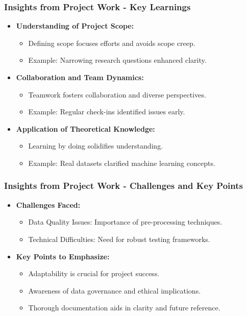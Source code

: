 \documentclass[aspectratio=169]{beamer}
\begin{document}
\begin{frame}[fragile]
    \frametitle{Insights from Project Work - Key Learnings}
    \begin{itemize}
        \item \textbf{Understanding of Project Scope:}
        \begin{itemize}
            \item Defining scope focuses efforts and avoids scope creep.
            \item Example: Narrowing research questions enhanced clarity.
        \end{itemize}
        
        \item \textbf{Collaboration and Team Dynamics:}
        \begin{itemize}
            \item Teamwork fosters collaboration and diverse perspectives.
            \item Example: Regular check-ins identified issues early.
        \end{itemize}
        
        \item \textbf{Application of Theoretical Knowledge:}
        \begin{itemize}
            \item Learning by doing solidifies understanding.
            \item Example: Real datasets clarified machine learning concepts.
        \end{itemize}
    \end{itemize}
\end{frame}

\begin{frame}[fragile]
    \frametitle{Insights from Project Work - Challenges and Key Points}
    \begin{itemize}
        \item \textbf{Challenges Faced:}
        \begin{itemize}
            \item Data Quality Issues: Importance of pre-processing techniques.
            \item Technical Difficulties: Need for robust testing frameworks.
        \end{itemize}
        
        \item \textbf{Key Points to Emphasize:}
        \begin{itemize}
            \item Adaptability is crucial for project success.
            \item Awareness of data governance and ethical implications.
            \item Thorough documentation aids in clarity and future reference.
        \end{itemize}
    \end{itemize}
\end{frame}
\end{document}
